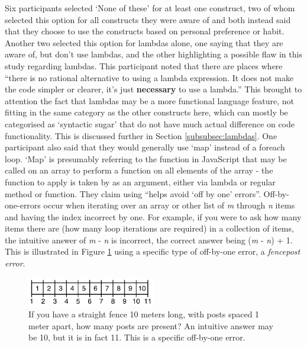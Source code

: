 \documentclass{article}
\begin{document}
            Six participants selected `None of these' for at least one construct, two of whom selected this option for all constructs they were aware of and both instead said that they choose to use the constructs based on personal preference or habit. Another two selected this option for lambdas alone, one saying that they are aware of, but don't use lambdas, and the other highlighting a possible flaw in this study regarding lambdas. This participant noted that there are places where ``there is no rational alternative to using a lambda expression. It does not make the code simpler or clearer, it's just \textbf{necessary} to use a lambda.'' This brought to attention the fact that lambdas may be a more functional language feature, not fitting in the same category as the other constructs here, which can mostly be categorised as `syntactic sugar' that do not have much actual difference on code functionality. This is discussed further in Section \ref{subsubsec:lambdas}.
            One participant also said that they would generally use `map' instead of a foreach loop. `Map' is presumably referring to the  function in JavaScript that may be called on an array to perform a function on all elements of the array - the function to apply is taken by  as an argument, either via lambda or regular method or function. They claim using  ``helps avoid `off by one' errors''.  Off-by-one-errors occur when iterating over an array or other list of \textit{m} through \textit{n} items and having the index incorrect by one. For example, if you were to ask how many items there are (how many loop iterations are required) in a collection of items, the intuitive answer of \textit{m} - \textit{n} is incorrect, the correct answer being (\textit{m} - \textit{n}) + 1. This is illustrated in Figure \ref{fig:fencepost} using a specific type of off-by-one error, a \textit{fencepost error}.
            \\

            \begin{figure}[htbp]
                \centering
                \includegraphics[width=0.5\textwidth]{fencepost}
                \caption{If you have a straight fence 10 meters long, with posts spaced 1 meter apart, how many posts are present? An intuitive answer may be 10, but it is in fact 11. This is a specific off-by-one error.}
                \label{fig:fencepost}
            \end{figure}
\end{document}

